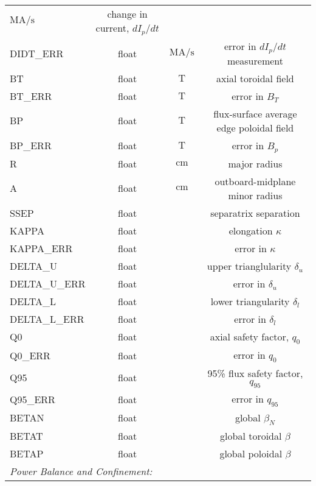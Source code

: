 \begin{table*}[h]
{\begin{tabular}{lccc}
   $\si{\mega\ampere\per\second}$ &
   change in current, $dI_p/dt$
   \\
   DIDT\_ERR &
   float &
   $\si{\mega\ampere\per\second}$ &
   error in $dI_p/dt$ measurement
   \\
   BT &
   float &
   $\si{\tesla}$ &
   axial toroidal field
   \\
   BT\_ERR &
   float &
   $\si{\tesla}$ &
   error in $B_T$
   \\
   BP &
   float &
   $\si{\tesla}$ &
   flux-surface average edge poloidal field
   \\
   BP\_ERR &
   float &
   $\si{\tesla}$ &
   error in $B_p$
   \\
   R &
   float &
   $\si{\centi\meter}$ &
   major radius
   \\
   A &
   float &
   $\si{\centi\meter}$ &
   outboard-midplane minor radius
   \\
   SSEP &
   float &
   \note{?} &
   separatrix separation\note{?}
   \\
   KAPPA &
   float &
   &
   elongation $\kappa$
   \\
   KAPPA\_ERR &
   float &
   &
   error in $\kappa$
   \\
   DELTA\_U &
   float &
   &
   upper trianglularity $\delta_u$
   \\
   DELTA\_U\_ERR &
   float &
   &
   error in $\delta_u$
   \\
   DELTA\_L &
   float &
   &
   lower triangularity $\delta_l$
   \\
   DELTA\_L\_ERR &
   float &
   &
   error in $\delta_l$
   \\
   Q0 &
   float &
   &
   axial safety factor, $q_0$
   \\
   Q0\_ERR &
   float &
   &
   error in $q_0$
   \\
   Q95 &
   float &
   &
   95\% flux safety factor, $q_{95}$
   \\
   Q95\_ERR &
   float &
   &
   error in $q_{95}$
   \\
   BETAN &
   float &
   &
   global $\beta_{N}$
   \\
   BETAT &
   float &
   &
   global toroidal $\beta$
   \\
   BETAP &
   float &
   &
   global poloidal $\beta$
   \\
   \midrule
   \multicolumn{4}{l}{\emph{Power Balance and Confinement:}}
   \\
   \midrule
   \bottomrule
  \end{tabular}}
\end{table*}

\nicechapterending